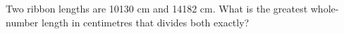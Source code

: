 Two ribbon lengths are 10130 cm and 14182 cm. What is the greatest whole-number length in centimetres that divides both exactly?
